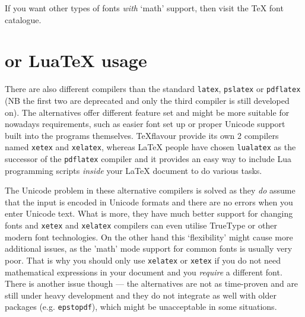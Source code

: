 If you want other types of fonts \emph{with} `math' support, then visit the
\TeX{} font catalogue.

\section{\XeTeX{} or Lua\TeX{} usage}

There are also different compilers than the standard \verb|latex|,
\verb|pslatex| or \verb|pdflatex| (NB the first two are deprecated and only the
third compiler is still developed on). 
%
The alternatives offer different feature set and might be more suitable for
nowadays requirements, such as easier font set up or proper Unicode support
built into the programs themselves. 
%
\XeTeX{} \TeX flavour provide its own 2 compilers named \verb|xetex| and \verb|xelatex|,
whereas \LaTeX{} people have chosen \verb|lualatex| as the successor of the
\verb|pdflatex| compiler and it provides an easy way to include Lua programming
scripts \emph{inside} your \LaTeX{} document to do various tasks.
 
 
 
The Unicode problem in these alternative compilers is solved as they \emph{do}
assume that the input is encoded in Unicode formats and there are no errors when
you enter Unicode text.
%
What is more, they have much better support for changing fonts and \verb|xetex|
and \verb|xelatex| compilers can even utilise TrueType or other modern font
technologies.
%
On the other hand this `flexibility' might cause more additional issues, as
the 'math' mode support for common fonts is usually very poor.
%
That is why you should only use \verb|xelatex| or \verb|xetex| if you do not
need mathematical expressions in your document and you \emph{require} a
different font.
%
There is another issue though --- the alternatives are not as time-proven and
are still under heavy development and they do not integrate as well with older
packages (e.g.  \verb|epstopdf|), which might be unacceptable in some
situations.



